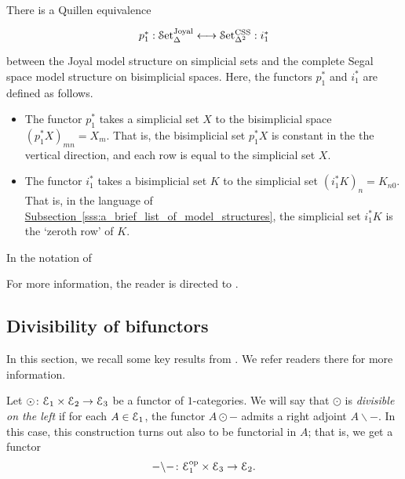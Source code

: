 \documentclass[main.tex]{subfiles}
\begin{document}
\begin{proposition}
  \label{prop:joyal-tierney_quillen_equivalence}
  There is a Quillen equivalence 
  \begin{equation*}
    \begin{tikzcd}
      p_{1}^{*} : \SSet^{\mathrm{Joyal}} \longleftrightarrow \SSSet^{\mathrm{CSS}} : i_{1}^{*}
    \end{tikzcd}
  \end{equation*}
  between the Joyal model structure on simplicial sets and the complete Segal space model structure on bisimplicial spaces. Here, the functors $p_{1}^{*}$ and $i_{1}^{*}$ are defined as follows.
  \begin{itemize}
    \item The functor $p_{1}^{*}$ takes a simplicial set $X$ to the bisimplicial space $(p_{1}^{*}X)_{mn} = X_{m}$. That is, the bisimplicial set $p_{1}^{*}X$ is constant in the the vertical direction, and each row is equal to the simplicial set $X$.

    \item The functor $i_{1}^{*}$ takes a bisimplicial set $K$ to the simplicial set $(i_{1}^{*}K)_{n} = K_{n0}$. That is, in the language of \hyperref[sss:a_brief_list_of_model_structures]{Subsection~\ref*{sss:a_brief_list_of_model_structures}}, the simplicial set $i_{1}^{*}K$ is the `zeroth row' of $K$.
  \end{itemize}
\end{proposition}

\begin{note}
  In the notation of
\end{note}

For more information, the reader is directed to \cite{qcats_vs_segal_spaces}.

\subsection{Divisibility of bifunctors}
\label{sss:divisibility_of_bifunctors}

In this section, we recall some key results from \cite{qcats_vs_segal_spaces}. We refer readers there for more information.

Let $\odot\colon \mathcal{E}_{1} \times \mathcal{E}_{2} \to \mathcal{E}_{3}$ be a functor of $1$-categories. We will say that $\odot$ is \emph{divisible on the left} if for each $A \in \mathcal{E}_{1}$, the functor $A \odot -$ admits a right adjoint $A \backslash -$. In this case, this construction turns out also to be functorial in $A$; that is, we get a functor
\begin{equation*}
  - \backslash -\colon \mathcal{E}_{1}^{\mathrm{op}} \times \mathcal{E}_{3} \to \mathcal{E}_{2}.
\end{equation*}
\end{document}
